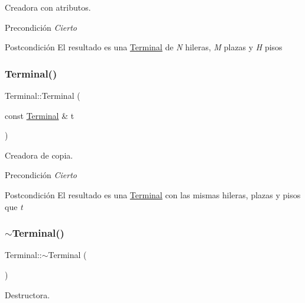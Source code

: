 Creadora con atributos. 

\begin{DoxyPrecond}{Precondición}
{\itshape Cierto} 
\end{DoxyPrecond}
\begin{DoxyPostcond}{Postcondición}
El resultado es una \hyperlink{class_terminal}{Terminal} de {\itshape N} hileras, {\itshape M} plazas y {\itshape H} pisos 
\end{DoxyPostcond}
\mbox{\label{class_terminal_a2502d3b03ed7f7f479b73e6575dedbf0}} 
\subsubsection{\texorpdfstring{Terminal()}{Terminal()}\hspace{0.1cm}{\footnotesize\ttfamily [3/3]}}
{\footnotesize\ttfamily Terminal\+::\+Terminal (\begin{DoxyParamCaption}\item[{const \hyperlink{class_terminal}{Terminal} \&}]{t }\end{DoxyParamCaption})}



Creadora de copia. 

\begin{DoxyPrecond}{Precondición}
{\itshape Cierto} 
\end{DoxyPrecond}
\begin{DoxyPostcond}{Postcondición}
El resultado es una \hyperlink{class_terminal}{Terminal} con las mismas hileras, plazas y pisos que {\itshape t} 
\end{DoxyPostcond}
\mbox{\label{class_terminal_add5a7d4dd45b68af9a0afb1cc845af2f}} 
\subsubsection{\texorpdfstring{$\sim$\+Terminal()}{~Terminal()}}
{\footnotesize\ttfamily Terminal\+::$\sim$\+Terminal (\begin{DoxyParamCaption}{ }\end{DoxyParamCaption})}



Destructora. 

